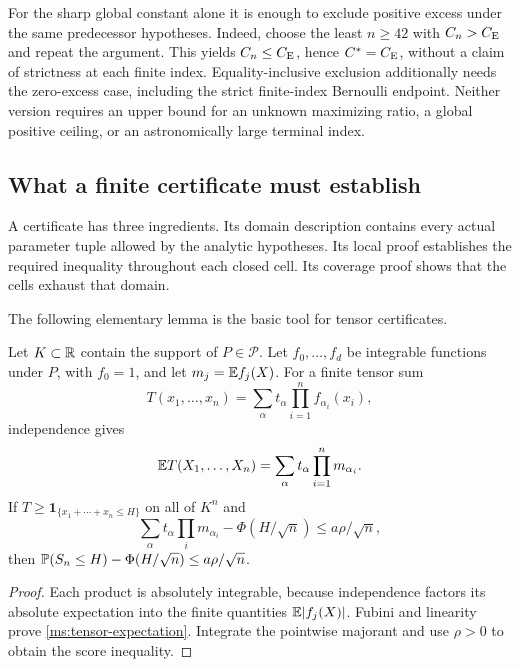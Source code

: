 For the sharp global constant alone it is enough to exclude positive
excess under the same predecessor hypotheses. Indeed, choose the least
$n\ge42$ with $C_n>C_{\mathrm E}$ and repeat the argument. This yields
$C_n\le C_{\mathrm E}$, hence $C^*=C_{\mathrm E}$, without a claim of strictness at each
finite index. Equality-inclusive exclusion additionally needs the
zero-excess case, including the strict finite-index Bernoulli endpoint.
Neither version requires an upper bound for an unknown maximizing ratio,
a global positive ceiling, or an astronomically large terminal index.

\subsection{What a finite certificate must establish}

A certificate has three ingredients. Its domain
description contains every actual parameter tuple allowed by the
analytic hypotheses. Its local proof establishes the required inequality
throughout each closed cell. Its coverage proof shows that the cells
exhaust that domain.

The following elementary lemma is the basic tool for tensor certificates.

\begin{lemma}
\label{ms:certificate-expectation}
Let $K\subset\mathbb R$ contain the support of $P\in\mathcal P$. Let
$f_0,\ldots,f_d$ be integrable functions under $P$, with $f_0=1$, and let
$m_j=\mathbb E f_j(X)$. For a finite tensor sum
\[
 T(x_1,\ldots,x_n)=\sum_{\alpha}t_\alpha
                              \prod_{i=1}^n f_{\alpha_i}(x_i),
\]
independence gives
\begin{equation}
 \mathbb E T(X_1,\ldots,X_n)=\sum_\alpha t_\alpha\prod_{i=1}^n m_{\alpha_i}.
\label{ms:tensor-expectation}
\end{equation}
If $T\ge\mathbf1_{\{x_1+\cdots+x_n\le H\}}$ on all of $K^n$ and
\[
 \sum_\alpha t_\alpha\prod_i m_{\alpha_i}
         -\Phi(H/\sqrt n)\le a\rho/\sqrt n,
\]
then $\mathbb P(S_n\le H)-\Phi(H/\sqrt n)\le a\rho/\sqrt n$.
\end{lemma}
\begin{proof}
Each product is absolutely integrable, because independence factors its
absolute expectation into the finite quantities $\mathbb E|f_j(X)|$.
Fubini and linearity prove \eqref{ms:tensor-expectation}. Integrate the
pointwise majorant and use $\rho>0$ to obtain the score inequality.

\end{proof}

